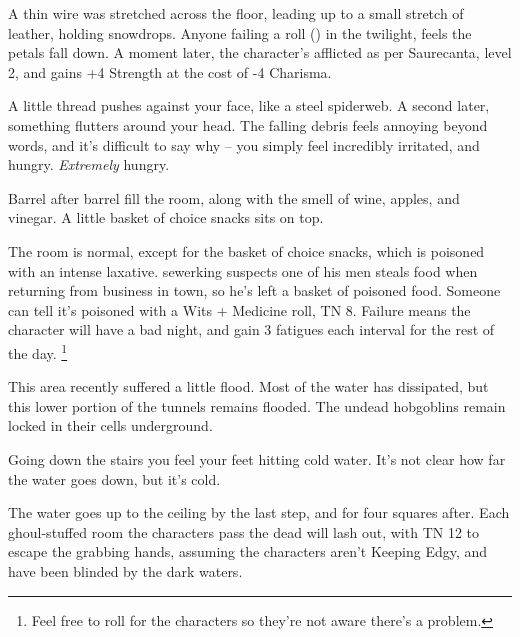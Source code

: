 A thin wire was stretched across the floor, leading up to a small stretch of leather, holding snowdrops.
Anyone failing a  roll (\tn[12]) in the twilight, feels the petals fall down.
A moment later, the character's afflicted as per Saurecanta, level 2, and gains +4 Strength at the cost of -4 Charisma.

\begin{boxtext}

  A little thread pushes against your face, like a steel spiderweb.
  A second later, something flutters around your head.
  The falling debris feels annoying beyond words, and it's difficult to say why -- you simply feel incredibly irritated, and hungry.
  \emph{Extremely} hungry.

\end{boxtext}

\begin{boxtext}

  Barrel after barrel fill the room, along with the smell of wine, apples, and vinegar.  A little basket of choice snacks sits on top.

\end{boxtext}


The room is normal, except for the basket of choice snacks, which is poisoned with an intense laxative.
\Gls{sewerking} suspects one of his men steals food when returning from business in \gls{town}, so he's left a basket of poisoned food.
Someone can tell it's poisoned with a Wits + Medicine roll, TN 8.
Failure means the character will have a bad night, and gain 3 \glspl{fatigue} each \gls{interval} for the rest of the day.%
\footnote{Feel free to roll for the characters so they're not aware there's a problem.}


This area recently suffered a little flood.  Most of the water has dissipated, but this lower portion of the tunnels remains flooded.  The undead hobgoblins remain locked in their cells underground.


\begin{boxtext}
  Going down the stairs you feel your feet hitting cold water.  It's not clear how far the water goes down, but it's cold.
\end{boxtext}

The water goes up to the ceiling by the last step, and for four squares after.  Each ghoul-stuffed room the characters pass the dead will lash out, with TN 12 to escape the grabbing hands, assuming the characters aren't Keeping Edgy, and have been blinded by the dark waters.

